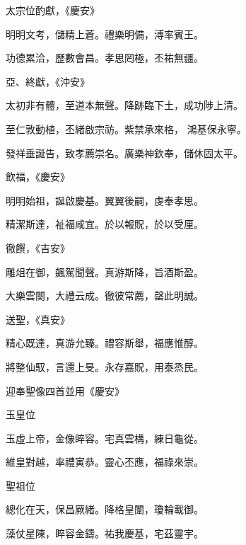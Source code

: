 \begin{pinyinscope}
 太宗位酌獻，《慶安》



 明明文考，儲精上蒼。禮樂明備，溥率賓王。



 功德累洽，歷數會昌。孝思罔極，丕祐無疆。



 亞、終獻，《沖安》



 太初非有體，至道本無聲。降跡臨下土，成功陟上清。



 至仁敦動植，丕緒啟宗祊。紫禁承來格，
 鴻基保永寧。



 發祥垂誕告，致孝薦崇名。廣樂神欽奉，儲休固太平。



 飲福，《慶安》



 明明始祖，誕啟慶基。翼翼後嗣，虔奉孝思。



 精潔斯達，祉福咸宜。於以報貺，於以受厘。



 徹饌，《吉安》



 雕俎在御，飆駕聞聲。真游斯降，旨酒斯盈。



 大樂雲闋，大禮云成。徹彼常薦，罄此明誠。



 送聖，《真安》



 精心既達，真游允臻。禮容斯舉，福應惟醇。



 將整仙馭，言還上旻。永存嘉貺，用泰烝民。



 迎奉聖像四首並用《慶安》



 玉皇位



 玉虛上帝，金像睟容。宅真雲構，練日龜從。



 維皇對越，率禮寅恭。靈心丕應，福祿來崇。



 聖祖位



 總化在天，保昌厥緒。降格皇闈，瓊輪載御。



 藻仗星陳，睟容金鑄。祐我慶基，宅茲靈宇。




\end{pinyinscope}
